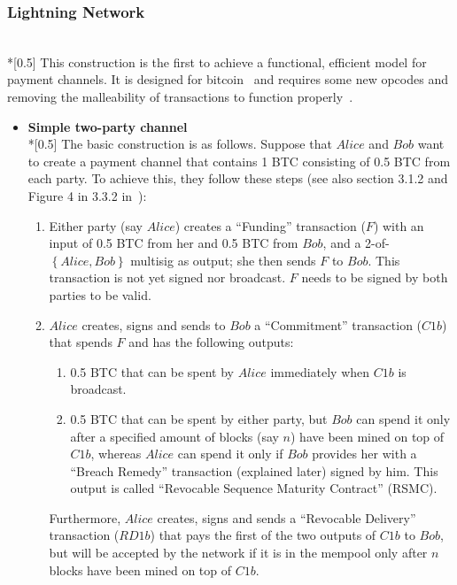 \subsubsection{Lightning Network} \ \\*[0.5\baselineskip]
  This construction is the first to achieve a functional, efficient model for payment
  channels. It is designed for bitcoin~\cite{bitcoin} and requires some new opcodes and
  removing the malleability of transactions to function properly~\cite{lightning}.

  \begin{itemize}
  \item \textbf{Simple two-party channel} \ \\*[0.5\baselineskip]
    The basic construction is as follows. Suppose that $Alice$ and $Bob$ want to create a
    payment channel that contains 1 BTC consisting of 0.5 BTC from each party. To achieve
    this, they follow these steps (see also section 3.1.2 and Figure 4 in 3.3.2
    in~\cite{lightning}):
    \begin{enumerate}
      \item Either party (say $Alice$) creates a ``Funding'' transaction ($F$) with an input
      of 0.5 BTC from her and 0.5 BTC from $Bob$, and a 2-of-$\left\{Alice, Bob\right\}$
      multisig as output; she then sends $F$ to $Bob$. This transaction is not yet signed
      nor broadcast. $F$ needs to be signed by both parties to be valid.

      \item $Alice$ creates, signs and sends to $Bob$ a ``Commitment'' transaction ($C1b$)
      that spends $F$ and has the following outputs:
      \begin{enumerate}
        \item 0.5 BTC that can be spent by $Alice$ immediately when $C1b$ is broadcast.
        \item 0.5 BTC that can be spent by either party, but $Bob$ can spend it only after
        a specified amount of blocks (say $n$) have been mined on top of $C1b$, whereas
        $Alice$ can spend it only if $Bob$ provides her with a ``Breach Remedy'' transaction
        (explained later) signed by him. This output is called ``Revocable Sequence
        Maturity Contract'' (RSMC).
      \end{enumerate}
      Furthermore, $Alice$ creates, signs and sends a ``Revocable Delivery'' transaction
      ($RD1b$) that pays the first of the two outputs of $C1b$ to $Bob$, but will be
      accepted by the network if it is in the mempool only after $n$ blocks have been
      mined on top of $C1b$.


\end{enumerate}
\end{itemize}

